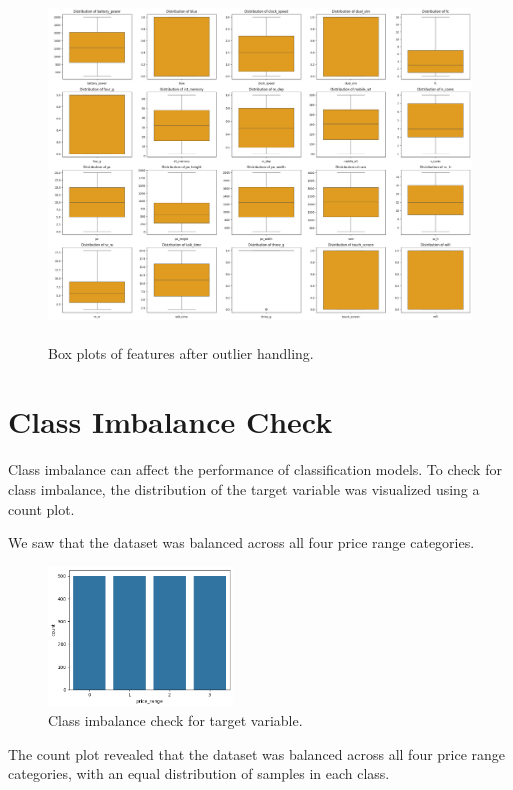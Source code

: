 \documentclass[12pt]{report}
\begin{document}
\begin{figure}[H]
	\centering
	\includegraphics[height=25em]{box_plots_after.png}
	\caption{Box plots of features after outlier handling.}
	\label{box_plots_after}
\end{figure}
\section{Class Imbalance Check}
Class imbalance can affect the performance of classification models. To check for class imbalance, the distribution of the target variable was visualized using a count plot. 

We saw that the dataset was balanced across all four price range categories.
\begin{figure}[H]
	\centering
	\includegraphics[height=10em]{imbalance_check.png}
	\caption{Class imbalance check for target variable.}
	\label{imbalance_check}
\end{figure}
The count plot revealed that the dataset was balanced across all four price range categories, with an equal distribution of samples in each class.
\end{document}
